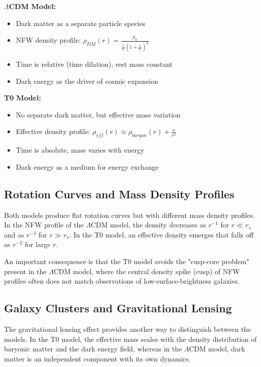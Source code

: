 \documentclass[a4paper,12pt]{article}
\begin{document}
	\begin{tcolorbox}[colback=green!5!white,colframe=green!75!black,title=Model Comparison]
		\textbf{$\Lambda$CDM Model:}
		\begin{itemize}
			\item Dark matter as a separate particle species
			\item NFW density profile: $\rho_{DM}(r) = \frac{\rho_0}{\frac{r}{r_s}(1 + \frac{r}{r_s})^2}$
			\item Time is relative (time dilation), rest mass constant
			\item Dark energy as the driver of cosmic expansion
		\end{itemize}
		
		\textbf{T0 Model:}
		\begin{itemize}
			\item No separate dark matter, but effective mass variation
			\item Effective density profile: $\rho_{eff}(r) \approx \rho_{baryon}(r) + \frac{\kappa}{r^2}$
			\item Time is absolute, mass varies with energy
			\item Dark energy as a medium for energy exchange
		\end{itemize}
	\end{tcolorbox}
	
	\subsection{Rotation Curves and Mass Density Profiles}
	
	Both models produce flat rotation curves but with different mass density profiles. In the NFW profile of the $\Lambda$CDM model, the density decreases as $r^{-1}$ for $r \ll r_s$ and as $r^{-3}$ for $r \gg r_s$. In the T0 model, an effective density emerges that falls off as $r^{-2}$ for large $r$.
	
	An important consequence is that the T0 model avoids the "cusp-core problem" present in the $\Lambda$CDM model, where the central density spike (cusp) of NFW profiles often does not match observations of low-surface-brightness galaxies.
	
	\subsection{Galaxy Clusters and Gravitational Lensing}
	
	The gravitational lensing effect provides another way to distinguish between the models. In the T0 model, the effective mass scales with the density distribution of baryonic matter and the dark energy field, whereas in the $\Lambda$CDM model, dark matter is an independent component with its own dynamics.
	
\end{document}
